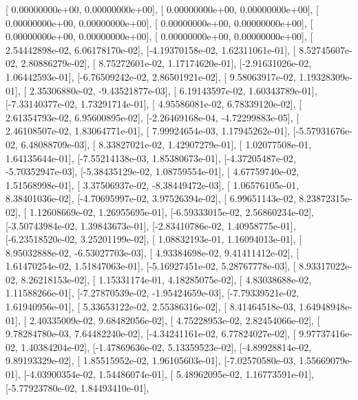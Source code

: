 \documentclass{article}
\begin{document}
       [ 0.00000000e+00,  0.00000000e+00],
       [ 0.00000000e+00,  0.00000000e+00],
       [ 0.00000000e+00,  0.00000000e+00],
       [ 0.00000000e+00,  0.00000000e+00],
       [ 0.00000000e+00,  0.00000000e+00],
       [ 0.00000000e+00,  0.00000000e+00],
       [ 2.54442898e-02,  6.06178170e-02],
       [-4.19370158e-02,  1.62311061e-01],
       [ 8.52745607e-02,  2.80886279e-02],
       [ 8.75272601e-02,  1.17174620e-01],
       [-2.91631026e-02,  1.06442593e-01],
       [-6.76509242e-02,  2.86501921e-02],
       [ 9.58063917e-02,  1.19328309e-01],
       [ 2.35306880e-02, -9.43521877e-03],
       [ 6.19143597e-02,  1.60343789e-01],
       [-7.33140377e-02,  1.73291714e-01],
       [ 4.95586081e-02,  6.78339120e-02],
       [ 2.61354793e-02,  6.95600895e-02],
       [-2.26469168e-04, -4.72299883e-05],
       [ 2.46108507e-02,  1.83064771e-01],
       [ 7.99924654e-03,  1.17945262e-01],
       [-5.57931676e-02,  6.48088709e-03],
       [ 8.33827021e-02,  1.42907279e-01],
       [ 1.02077508e-01,  1.64135644e-01],
       [-7.55214138e-03,  1.85380673e-01],
       [-4.37205487e-02, -5.70352947e-03],
       [-5.38435129e-02,  1.08759554e-01],
       [ 4.67759740e-02,  1.51568998e-01],
       [ 3.37506937e-02, -8.38449472e-03],
       [ 1.06576105e-01,  8.38401036e-02],
       [-4.70695997e-02,  3.97526394e-02],
       [ 6.99651143e-02,  8.23872315e-02],
       [ 1.12608669e-02,  1.26955695e-01],
       [-6.59333015e-02,  2.56860234e-02],
       [-3.50743984e-02,  1.39843673e-01],
       [-2.83410786e-02,  1.40958775e-01],
       [-6.23518520e-02,  3.25201199e-02],
       [ 1.08832193e-01,  1.16094013e-01],
       [ 8.95032888e-02, -6.53027703e-03],
       [ 4.93384698e-02,  9.41411412e-02],
       [ 1.61470254e-02,  1.51847063e-01],
       [-5.16927451e-02,  5.28767778e-03],
       [ 8.93317022e-02,  8.26218153e-02],
       [ 1.15331174e-01,  4.18285075e-02],
       [ 4.83038688e-02,  1.11588266e-01],
       [-7.27870539e-02, -1.95424659e-03],
       [-7.79339521e-02,  1.61940956e-01],
       [ 5.33653122e-02,  2.55386316e-02],
       [ 8.41464518e-03,  1.64948948e-01],
       [ 2.40335009e-02,  9.68482056e-02],
       [ 4.75228953e-02,  2.82454066e-02],
       [ 9.78284780e-03,  7.64482240e-02],
       [-4.34241161e-02,  6.77824027e-02],
       [ 9.97737416e-02,  1.40384204e-02],
       [-1.47869636e-02,  5.13359523e-02],
       [-4.89928814e-02,  9.89193329e-02],
       [ 1.85515952e-02,  1.96105603e-01],
       [-7.02570580e-03,  1.55669079e-01],
       [-4.03900354e-02,  1.54486074e-01],
       [ 5.48962095e-02,  1.16773591e-01],
       [-5.77923780e-02,  1.84493410e-01],
\end{document}
